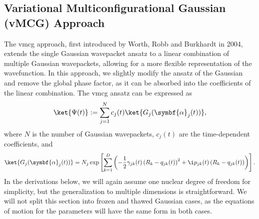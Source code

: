 \subsection{Variational Multiconfigurational Gaussian (vMCG) Approach}
The \acrshort{vmcg} approach, first introduced by Worth, Robb and Burkhardt in 2004,\cite{10.1039/B314253A} extends the single Gaussian wavepacket ansatz to a linear combination of multiple Gaussian wavepackets, allowing for a more flexible representation of the wavefunction. In this approach, we slightly modify the ansatz of the Gaussian and remove the global phase factor, as it can be absorbed into the coefficients of the linear combination. The \acrshort{vmcg} ansatz can be expressed as
\begin{equation}
\ket{\Psi(t)}:=\sum_{j=1}^N c_j(t)\ket{G_j(\symbf{\alpha}_j(t))},
\end{equation}
where $N$ is the number of Gaussian wavepackets, $c_j(t)$ are the time-dependent coefficients, and
\begin{equation}\label{eq:vmcg_gaussian_wavepacket}
\ket{G_j(\symbf{\alpha}_j(t))}=N_j\exp\left[\sum_{k=1}^D\left(-\frac{1}{2}\gamma_{jk}(t)\left(R_k-q_{jk}(t)\right)^2+\i p_{jk}(t)\left(R_k-q_{jk}(t)\right)\right)\right].
\end{equation}
In the derivations below, we will again assume one nuclear degree of freedom for simplicity, but the generalization to multiple dimensions is straightforward. We will not split this section into frozen and thawed Gaussian cases, as the equations of motion for the parameters will have the same form in both cases.

